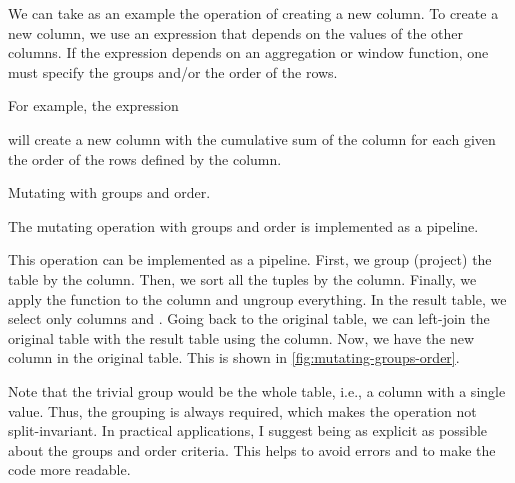 We can take as an example the operation of creating a new column.  To create a new column,
we use an expression that depends on the values of the other columns.  If the expression
depends on an aggregation or window function, one must specify the groups and/or the order
of the rows.

For example, the expression
\begin{center}
\end{center}
will create a new column  with the cumulative sum of the  column for each
 given the order of the rows defined by the  column.

\begin{figurebox}[label=fig:mutating-groups-order]{Mutating with groups and order.}
  \centering
  \tcblower
  The mutating operation with groups and order is implemented as a pipeline.
\end{figurebox}

This operation can be implemented as a pipeline.  First, we group (project) the table by
the  column.  Then, we sort all the tuples by the  column. Finally,
we apply the  function to the  column and ungroup everything.  In the
result table, we select only columns  and .  Going back to the
original table, we can left-join the original table with the result table using the
 column.  Now, we have the new column  in the original table.
This is shown in \cref{fig:mutating-groups-order}.

Note that the trivial group would be the whole table, i.e., a column with a single value.
Thus, the grouping is always required, which makes the operation not split-invariant.
In practical applications, I suggest being as explicit as possible about the groups and
order criteria.  This helps to avoid errors and to make the code more readable.

